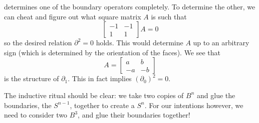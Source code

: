 determines one of the boundary operators completely. To determine
the other, we can cheat and figure out what square matrix $A$ is such
that
\begin{equation}%
\begin{bmatrix} -1 & -1\\1 & 1\end{bmatrix}A = 0
\end{equation}
so the desired relation $\partial^{2}=0$ holds. This would
determine $A$ up to an arbitrary sign (which is determined by the
orientation of the faces). We see that
\begin{equation}%
A = \begin{bmatrix}a & b\\
-a & -b\end{bmatrix}
\end{equation}
is the structure of $\partial_{1}$. This in fact implies $(\partial_{0})^{2}=0$.

The inductive ritual should be clear: we take two copies of
$B^{n}$ and glue the boundaries, the $S^{n-1}$, together to
create a $S^{n}$. For our intentions however, we need to consider
two $B^{3}$, and glue their boundaries together!
